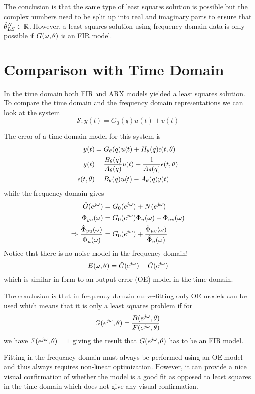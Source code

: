 The conclusion is that the same type of least squares solution is possible but the complex numbers need to be split up into real and imaginary parts to ensure that $\hat{\theta}_{LS}^N\in\mathbb{R}$.
However, a least squares solution using frequency domain data is only possible if $G(\omega,\theta)$ is an FIR model.

\section{Comparison with Time Domain}
In the time domain both FIR and ARX models yielded a least squares solution.
To compare the time domain and the frequency domain representations we can look at the system
$$\mathcal{S}: y(t) = G_0(q)u(t) + v(t)$$

The error of a time domain model for this system is
\begin{align*}
y(t) &= G_\theta(q) u(t)+H_\theta(q)\epsilon(t,\theta) \\
y(t) &= \frac{B_\theta(q)}{A_\theta(q)}u(t) + \frac{1}{A_\theta(q)}\epsilon(t,\theta) \\
\epsilon(t,\theta) &= B_\theta(q)u(t) - A_\theta(q)y(t)
\end{align*}
while the frequency domain gives
\begin{align*}
\hat{G}(e^{j\omega}) &= G_0(e^{j\omega}) + N(e^{j\omega}) \\
\Phi_{yu}(\omega) &= G_0(e^{j\omega})\Phi_u(\omega) + \Phi_{uv}(\omega) \\
\Rightarrow \frac{\hat{\Phi}_{yu}(\omega)}{\hat{\Phi}_u(\omega)} &= G_0(e^{j\omega}) + \frac{\hat{\Phi}_{uv}(\omega)}{\hat{\Phi}_u(\omega)}
\end{align*}
Notice that there is no noise model in the frequency domain!
$$E(\omega,\theta) = \hat{G}(e^{j\omega}) - \tilde{G}(e^{j\omega})$$
which is similar in form to an output error (OE) model in the time domain.

The conclusion is that in frequency domain curve-fitting only OE models can be used which means that it is only a least squares problem if for
$$G(e^{j\omega},\theta) = \frac{B(e^{j\omega},\theta)}{F(e^{j\omega},\theta)}$$
we have $F(e^{j\omega},\theta) = 1$ giving the result that $G(e^{j\omega},\theta)$ has to be an FIR model.

Fitting in the frequency domain must always be performed using an OE model and thus always requires non-linear optimization.
However, it can provide a nice visual confirmation of whether the model is a good fit as opposed to least squares in the time domain which does not give any visual confirmation.

